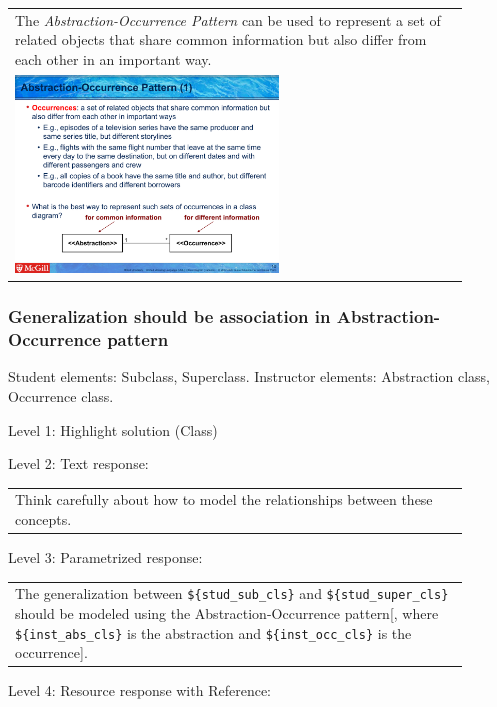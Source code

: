 \begin{tabular}{|p{0.9\linewidth}}
The \textit{Abstraction-Occurrence Pattern} can be used to 
represent a set of related objects that share common information but also differ
from each other in an important way.

\\
\includegraphics[width=0.6\textwidth]{images/abstraction_occurrence.png}
\end{tabular} \medskip


\subsubsection{Generalization should be association in Abstraction-Occurrence pattern}

Student elements: Subclass, Superclass. Instructor elements: Abstraction class, Occurrence class. \medskip

\noindent Level 1: Highlight solution (Class) \medskip

\noindent Level 2: Text response: \medskip

\begin{tabular}{|p{0.9\linewidth}}
Think carefully about how to model the relationships between these concepts.
\end{tabular} \medskip

\noindent Level 3: Parametrized response: \medskip

\begin{tabular}{|p{0.9\linewidth}}
The generalization between \verb|${stud_sub_cls}| and \verb|${stud_super_cls}| should be modeled using the Abstraction-Occurrence pattern[, where \verb|${inst_abs_cls}| is the abstraction and \verb|${inst_occ_cls}| is the occurrence].
\end{tabular} \medskip

\noindent Level 4: Resource response with Reference: \medskip

